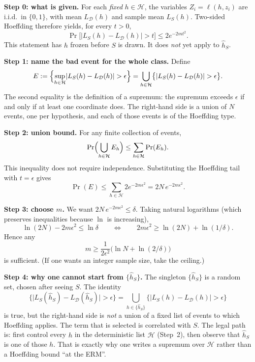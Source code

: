 \begin{solution}
\textbf{Step 0: what is given.}
For each \emph{fixed} $h\in\mathcal{H}$, the variables $Z_i=\ell(h,z_i)$ are i.i.d.\ in $\{0,1\}$, with mean $L_{\mathcal{D}}(h)$ and sample mean $L_S(h)$. Two-sided Hoeffding therefore yields, for every $t>0$,
\[
\Pr\bigl[\lvert L_S(h)-L_{\mathcal{D}}(h)\rvert>t\bigr]\le 2e^{-2mt^2}.
\]
This statement has $h$ frozen before $S$ is drawn. It does \emph{not} yet apply to $\widehat{h}_S$.

\textbf{Step 1: name the bad event for the whole class.}
Define
\[
E
:=
\Bigl\{\sup_{h\in\mathcal{H}}\lvert L_S(h)-L_{\mathcal{D}}(h)\rvert>\epsilon\Bigr\}
=
\bigcup_{h\in\mathcal{H}}
\bigl\{\lvert L_S(h)-L_{\mathcal{D}}(h)\rvert>\epsilon\bigr\}.
\]
The second equality is the definition of a supremum: the supremum exceeds $\epsilon$ if and only if at least one coordinate does. The right-hand side is a union of $N$ events, one per hypothesis, and each of those events is of the Hoeffding type.

\textbf{Step 2: union bound.}
For any finite collection of events,
\[
\Pr\Bigl(\bigcup_{h\in\mathcal{H}}E_h\Bigr)
\le
\sum_{h\in\mathcal{H}}\Pr(E_h).
\]
This inequality does not require independence. Substituting the Hoeffding tail with $t=\epsilon$ gives
\[
\Pr(E)
\le
\sum_{h\in\mathcal{H}}2e^{-2m\epsilon^2}
=
2N\,e^{-2m\epsilon^2}.
\]

\textbf{Step 3: choose $m$.}
We want $2N\,e^{-2m\epsilon^2}\le\delta$. Taking natural logarithms (which preserves inequalities because $\ln$ is increasing),
\[
\ln(2N)-2m\epsilon^2\le\ln\delta
\qquad\Longleftrightarrow\qquad
2m\epsilon^2\ge\ln(2N)+\ln(1/\delta).
\]
Hence any
\[
m
\ge
\frac{1}{2\epsilon^2}\bigl(\ln N+\ln(2/\delta)\bigr)
\]
is sufficient. (If one wants an integer sample size, take the ceiling.)

\textbf{Step 4: why one cannot start from $\{\widehat{h}_S\}$.}
The singleton $\{\widehat{h}_S\}$ is a random set, chosen after seeing $S$. The identity
\[
\bigl\{\lvert L_S(\widehat{h}_S)-L_{\mathcal{D}}(\widehat{h}_S)\rvert>\epsilon\bigr\}
=
\bigcup_{h\in\{\widehat{h}_S\}}
\bigl\{\lvert L_S(h)-L_{\mathcal{D}}(h)\rvert>\epsilon\bigr\}
\]
is true, but the right-hand side is \emph{not} a union of a fixed list of events to which Hoeffding applies. The term that is selected is correlated with $S$. The legal path is: first control every $h$ in the deterministic list $\mathcal{H}$ (Step~2), then observe that $\widehat{h}_S$ is one of those $h$. That is exactly why one writes a supremum over $\mathcal{H}$ rather than a Hoeffding bound ``at the ERM''.
\end{solution}


